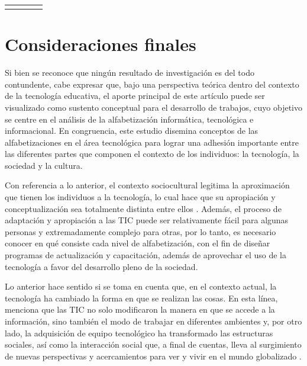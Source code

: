 \documentclass[spanish]{textolivre}
\begin{document}
\begin{small}
\begin{longtable}{c!{\color[gray]{.7}\vline}c!{\color[gray]{.7}\vline}cp{7.6cm}}
\bottomrule
{}
\end{longtable}
\end{small}

\section{Consideraciones finales}\label{sec-consideracoes}
Si bien se reconoce que ningún resultado de investigación es del todo contundente, cabe expresar que, bajo una perspectiva teórica dentro del contexto de la tecnología educativa, el aporte principal de este artículo puede ser visualizado como sustento conceptual para el desarrollo de trabajos, cuyo objetivo se centre en el análisis de la alfabetización informática, tecnológica e informacional. En congruencia, este estudio disemina conceptos de las alfabetizaciones en el área tecnológica para lograr una adhesión importante entre las diferentes partes que componen el contexto de los individuos: la tecnología, la sociedad y la cultura. 

Con referencia a lo anterior, el contexto sociocultural legitima la aproximación que tienen los individuos a la tecnología, lo cual hace que su apropiación y conceptualización sea totalmente distinta entre ellos \cite{rueda_ramos_adultos_2009}. Además, el proceso de adaptación y apropiación a las TIC puede ser relativamente fácil para algunas personas y extremadamente complejo para otras, por lo tanto, es necesario conocer en qué consiste cada nivel de alfabetización, con el fin de diseñar programas de actualización y capacitación, además de aprovechar el uso de la tecnología a favor del desarrollo pleno de la sociedad. 

Lo anterior hace sentido si se toma en cuenta que, en el contexto actual, la tecnología ha cambiado la forma en que se realizan las cosas. En esta línea, \textcite{castano_munoz_alfabetizaciones_2014} menciona que las TIC no solo modificaron la manera en que se accede a la información, sino también el modo de trabajar en diferentes ambientes y, por otro lado, la adquisición de equipo tecnológico ha transformado las estructuras sociales, así como la interacción social que, a final de cuentas, lleva al surgimiento de nuevas perspectivas y acercamientos para ver y vivir en el mundo globalizado \cite{carrera_cruce_2019}.
\end{document}
